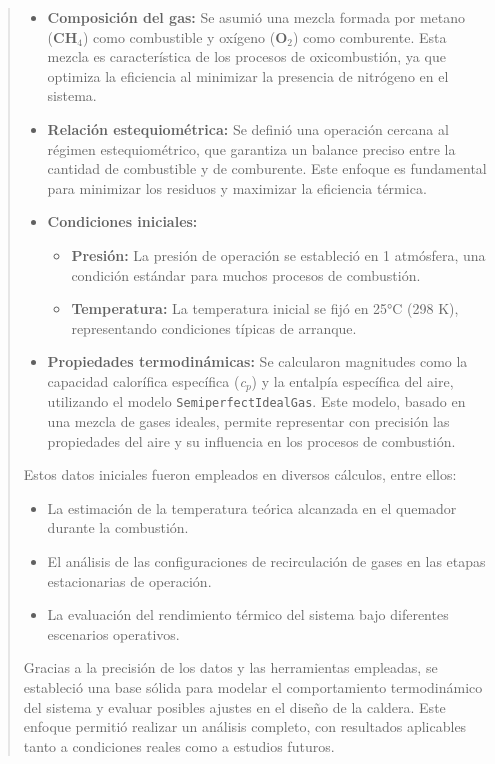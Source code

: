 \documentclass[11pt, a4paper]{article}
\begin{document}
\begin{quote}
\begin{center}
\begin{adjustwidth}{-1.7cm}{-1cm}
\begin{itemize}
    \item \textbf{Composición del gas:} Se asumió una mezcla formada por metano (\textbf{CH$_4$}) como combustible y oxígeno (\textbf{O$_2$}) como comburente. Esta mezcla es característica de los procesos de oxicombustión, ya que optimiza la eficiencia al minimizar la presencia de nitrógeno en el sistema.
    \item \textbf{Relación estequiométrica:} Se definió una operación cercana al régimen estequiométrico, que garantiza un balance preciso entre la cantidad de combustible y de comburente. Este enfoque es fundamental para minimizar los residuos y maximizar la eficiencia térmica.
    \item \textbf{Condiciones iniciales:} 
    \begin{itemize}
        \item \textbf{Presión:} La presión de operación se estableció en 1 atmósfera, una condición estándar para muchos procesos de combustión.
        \item \textbf{Temperatura:} La temperatura inicial se fijó en 25°C (298 K), representando condiciones típicas de arranque.
    \end{itemize}
    \item \textbf{Propiedades termodinámicas:} Se calcularon magnitudes como la capacidad calorífica específica (\textit{c$_p$}) y la entalpía específica del aire, utilizando el modelo \texttt{SemiperfectIdealGas}. Este modelo, basado en una mezcla de gases ideales, permite representar con precisión las propiedades del aire y su influencia en los procesos de combustión.
\end{itemize}

Estos datos iniciales fueron empleados en diversos cálculos, entre ellos:
\begin{itemize}
    \item La estimación de la temperatura teórica alcanzada en el quemador durante la combustión.
    \item El análisis de las configuraciones de recirculación de gases en las etapas estacionarias de operación.
    \item La evaluación del rendimiento térmico del sistema bajo diferentes escenarios operativos.
\end{itemize}

Gracias a la precisión de los datos y las herramientas empleadas, se estableció una base sólida para modelar el comportamiento termodinámico del sistema y evaluar posibles ajustes en el diseño de la caldera. Este enfoque permitió realizar un análisis completo, con resultados aplicables tanto a condiciones reales como a estudios futuros.




\end{adjustwidth}
\end{center}
\end{quote}
\end{document}

